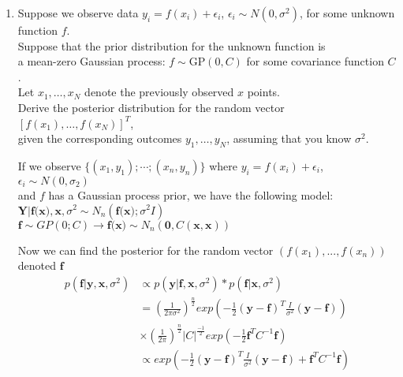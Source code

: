 \documentclass{homework}
\newcommand{\1}{\mathbf{1}}
\begin{document}
\begin{enumerate}[label=(\Alph*)]

\item Suppose we observe data $y_i = f(x_i) + \epsilon_i$, $\epsilon_i \sim N(0, \sigma^2)$, for some unknown function $f$. \\Suppose that the prior distribution for the unknown function is\\ a mean-zero Gaussian process: $f \sim \mbox{GP}(0, C)$ for some covariance function $C$.  \\Let $x_1, \ldots, x_N$ denote the previously observed $x$ points.  \\Derive the posterior distribution for the random vector $[f(x_1), \ldots, f(x_N)]^T$, \\given the corresponding outcomes $y_1, \ldots, y_N$, assuming that you know $\sigma^2$.
\\
\par If we observe $\{(x_1,y_1);\cdots;(x_n,y_n)\}$ where $y_i = f(x_i) + \epsilon_i$, $\epsilon_i \sim N(0,\sigma_2)$ \\and $f$ has a Gaussian process prior, we have the following model:\\
$\textbf{Y} | \textbf{f(x)}, \textbf{x}, \sigma^2 \sim N_n(\textbf{f(x)}; \sigma^2 I)$ \\
$\textbf{f} \sim GP(0;C)  \rightarrow \textbf{f(x)} \sim N_n(\textbf{0},C(\textbf{x},\textbf{x}))$
\\
\par Now we can find the posterior for the random vector $(f(x_1 ), . . . , f(x_n ))$ denoted  $\textbf{f}$\\

\begin{equation} \begin{split}
p(\textbf{f} | \textbf{y}, \textbf{x}, \sigma^2) &\propto p(\textbf{y} | \textbf{f}, \textbf{x}, \sigma^2) * p(\textbf{f}|\textbf{x}, \sigma^2) \\
& = (\frac{1}{2\pi \sigma^2})^{\frac{n}{2}} exp\left( -\frac{1}{2}( \textbf{y} - \textbf{f})^T \frac{I}{\sigma^2}(\textbf{y} - \textbf{f}) \right) \\
& \times  (\frac{1}{2\pi})^{\frac{n}{2}} | C |^{\frac{-1}{2}} exp\left( -\frac{1}{2}\textbf{f}^TC^{-1} \textbf{f}\right)\\
&\propto exp\left( -\frac{1}{2}( \textbf{y} - \textbf{f})^T \frac{I}{\sigma^2}(\textbf{y} - \textbf{f}) + \textbf{f}^TC^{-1} \textbf{f} \right)
\end{split} \end{equation}


\end{enumerate}
\end{document}
